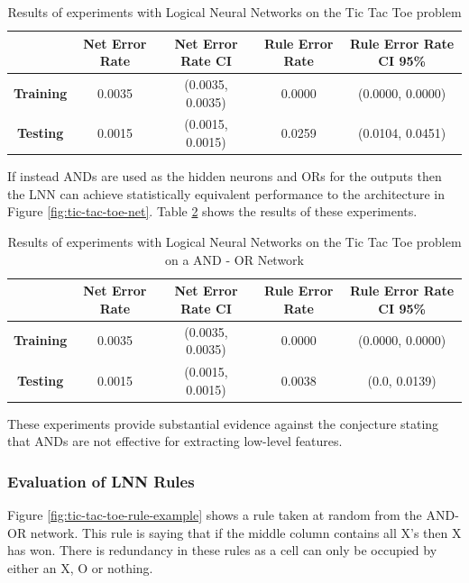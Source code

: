 \begin{table}[H]
	\begin{center}
		\begin{tabular}{| c | c | c | c | c |}
			\hline
			\textbf{} & \textbf{Net Error Rate} & \textbf{Net Error Rate CI} & \textbf{Rule Error Rate} & \textbf{Rule Error Rate CI 95\%}\\
			\hline
			\hline
			\textbf{Training} & 0.0035 & (0.0035, 0.0035) & 0.0000 & (0.0000, 0.0000)\\
			\textbf{Testing} & 0.0015 & (0.0015, 0.0015) & 0.0259 & (0.0104, 0.0451)\\
			\hline
		\end{tabular}
	\end{center}
	\caption{Results of experiments with Logical Neural Networks on the Tic Tac Toe problem}
	\label{tab:tic-tac-toe-lnn-peformance-results}
\end{table}
If instead ANDs are used as the hidden neurons and ORs for the outputs then the LNN can achieve statistically equivalent performance to the architecture in Figure \ref{fig:tic-tac-toe-net}. Table \ref{tab:tic-tac-toe-lnn-peformance-results-and-or} shows the results of these experiments.

\begin{table}[H]
	\begin{center}
		\begin{tabular}{| c | c | c | c | c |}
			\hline
			\textbf{} & \textbf{Net Error Rate} & \textbf{Net Error Rate CI} & \textbf{Rule Error Rate} & \textbf{Rule Error Rate CI 95\%}\\
			\hline
			\hline
			\textbf{Training} & 0.0035 & (0.0035, 0.0035) & 0.0000 & (0.0000, 0.0000)\\
			\textbf{Testing} & 0.0015 & (0.0015, 0.0015) & 0.0038 & (0.0, 0.0139)\\
			\hline
		\end{tabular}
	\end{center}
	\caption{Results of experiments with Logical Neural Networks on the Tic Tac Toe problem on a AND - OR Network}
	\label{tab:tic-tac-toe-lnn-peformance-results-and-or}
\end{table}

These experiments provide substantial evidence against the conjecture stating that ANDs are not effective for extracting low-level features.

\subsubsection{Evaluation of LNN Rules}
Figure \ref{fig:tic-tac-toe-rule-example} shows a rule taken at random from the AND-OR network. This rule is saying that if the middle column contains all X's then X has won. There is redundancy in these rules as a cell can only be occupied by either an X, O or nothing.

